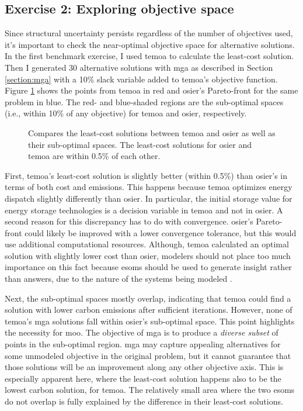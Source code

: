 \subsection{Exercise 2: Exploring objective space}
Since structural uncertainty persists regardless of the number of objectives
used, it's important to check the near-optimal objective space for alternative
solutions. In the first benchmark exercise, I used \ac{temoa} to calculate the
least-cost solution. Then I generated 30 alternative solutions with \ac{mga} as
described in Section \ref{section:mga} with a 10\% slack variable added to
\ac{temoa}'s objective function. Figure \ref{fig:temoa-benchmark-01} shows the
points from \ac{temoa} in red and \ac{osier}'s Pareto-front for the same problem
in blue. The red- and blue-shaded regions are the sub-optimal spaces (i.e.,
within 10\% of any objective) for \ac{temoa} and \ac{osier}, respectively.

\begin{figure}[h]
  \centering
  \resizebox{0.6\columnwidth}{!}{}
  \caption{Compares the least-cost solutions between \acs{temoa}
  and \acs{osier} as well as their sub-optimal spaces. The least-cost solutions
  for \ac{osier} and \ac{temoa} are within 0.5\% of each other.}
  \label{fig:temoa-benchmark-01}
\end{figure}

First, \ac{temoa}'s least-cost solution is slightly better (within 0.5\%) than
\ac{osier}'s in terms of both cost and emissions. This happens because
\ac{temoa} optimizes energy dispatch slightly differently than \ac{osier}. In
particular, the initial storage value for energy storage technologies is a
decision variable in \ac{temoa} and not in \ac{osier}. A second reason for this
discrepancy has to do with convergence. \ac{osier}'s Pareto-front could likely
be improved with a lower convergence tolerance, but this would use additional
computational resources. Although, \ac{temoa} calculated an optimal solution
with slightly lower cost than \ac{osier}, modelers should not place too much
importance on this fact because \acp{esom} should be used to generate insight
rather than answers, due to the nature of the systems being modeled
\cite{decarolis_using_2011}.

Next, the sub-optimal spaces mostly overlap, indicating that \ac{temoa} could
find a solution with lower carbon emissions after sufficient iterations.
However, none of \ac{temoa}'s \ac{mga} solutions fall within \ac{osier}'s
sub-optimal space. This point highlights the necessity for \acl{moo}. The
objective of \ac{mga} is to produce a \textit{diverse subset} of points in the
sub-optimal region. \ac{mga} may capture appealing alternatives for some
unmodeled objective in the original problem, but it cannot guarantee that those
solutions will be an improvement along any other objective axis. This is
especially apparent here, where the least-cost solution happens also to be the
lowest carbon solution, for \ac{temoa}. The relatively small area where the two
\acp{esom} do not overlap is fully explained by the difference in their
least-cost solutions.

